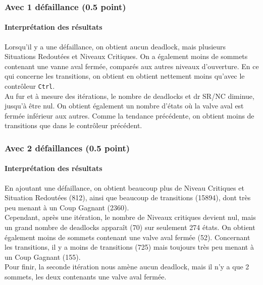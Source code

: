 \documentclass[a4paper]{book}
\begin{document}
\subsubsection{Avec 1 défaillance (0.5 point)}





\paragraph{Interprétation des résultats}
Lorsqu'il y a une défaillance, on obtient aucun deadlock, mais plusieurs Situations Redoutées et Niveaux Critiques. 
On a également moins de sommets contenant une vanne aval fermée, comparés aux autres niveaux d'ouverture. En ce qui concerne les 
transitions, on obtient en obtient nettement moins qu'avec le contrôleur {\tt Ctrl}. \\
Au fur et à mesure des itérations, le nombre de deadlocks et dr SR/NC diminue, jusqu'à être nul. On obtient également un nombre d'états où la valve aval est fermée
inférieur aux autres. Comme la tendance précédente, on obtient moins de transitions que dans le contrôleur précédent.

\subsubsection{Avec 2 défaillances (0.5 point)}




%
\paragraph{Interprétation des résultats}
En ajoutant une défaillance, on obtient beaucoup plus de Niveau Critiques et 
Situation Redoutées (812), ainsi que beaucoup de transitions (15894), dont très peu menant à un Coup Gagnant (2360). \\
Cependant, après une itération, le nombre de Niveaux critiques devient nul, mais un grand nombre de deadlocks apparaît (70)
sur seulement 274 états. On obtient également moins de sommets contenant une valve aval fermée (52).
Concernant les transitions, il y a moins de transitions (725) mais toujours très peu menant à un Coup Gagnant (155).\\
Pour finir, la seconde itération nous amène aucun deadlock, mais il n'y a que 2 sommets, les deux contenants une valve aval fermée.
\end{document}
